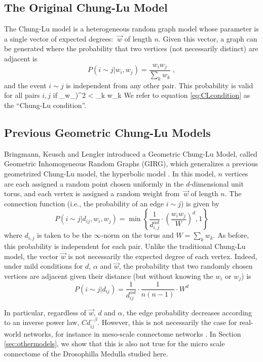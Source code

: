 \documentclass[11]{article}
\def\ba #1\ea{\begin{align} #1 \end{align}}
\theoremstyle{remark}
\theoremstyle{definition}
\begin{document}
\subsection{The Original Chung-Lu Model \label{sec:CLorig}}

The Chung-Lu model \cite{chunglu} is a heterogeneous random graph model whose parameter is a single vector of expected degrees: $\ \vec w$ of length $n$. Given this vector, a graph can be generated where the probability that two vertices (not necessarily distinct) are adjacent is 
\[ P(i \sim j | w_i, w_j) = \frac{w_i w_j}{\sum_k w_k}\;, \]
and the event $i \sim j$ is independent from any other pair.
This probability is valid for all pairs $i, j$ if
\ba  (\max_\ell w_\ell)^2 < \sum_k w_k \label{eq:CLcondition}\ea
We refer to equation \ref{eq:CLcondition} as the ``Chung-Lu condition''.

\subsection{Previous Geometric Chung-Lu Models\label{sec:CLgeomother}}

Bringmann, Keusch and Lengler  introduced a Geometric Chung-Lu Model, called Geometric Inhomogeneous Random Graphs (GIRG), \cite{bringmann2019geometric} which generalizes a previous geometrized Chung-Lu model, the hyperbolic model \cite{hyperchunglu}. In this model, $n$ vertices are each assigned a random point chosen uniformly in the $d$-dimensional unit torus, and each vertex is assigned a random weight from $\ \vec w$ of length $n$. The connection function (i.e., the probability of an edge $i\sim j$) is given by
\[ P(i \sim j | d_{ij}, w_i, w_j ) = \min \left \{  \frac{1}{d_{i,j}^{\alpha d}} \cdot \left( \frac{w_i w_j}{W} \right)^{d}, 1 \right \} \]
where $d_{i,j}$ is taken to be the $\infty$-norm on the torus and $W = \sum_k w_k$. As before, this probability is independent for each pair.  Unlike the traditional Chung-Lu model, the vector $\vec w$ is not necessarily the expected degree of each vertex. 
Indeed, under mild conditions for $d$, $\alpha$ and $\vec w$, the probability that two randomly chosen vertices are adjacent given their distance (but without knowing the $w_i$ or $w_j$) is 
\[ P(i\sim j | d_{ij}) = \frac{1}{d_{ij}^{\alpha d}} \cdot \frac{1}{n(n-1)} \cdot W^d  \]

In particular, regardless of $\vec w$, $d$ and $\alpha$, the edge probability decreases according to an inverse power law, $C d_{ij}^{-\beta}$. However, this is not necessarily the case for real-world networks, for instance in meso-scale connectome networks \cite{humanspatialconnectome,connectometutorial,marmoset}.
In Section \ref{sec:othermodels}, we show that this is also not true for the micro scale connectome of the Drosophilla Medulla studied here.
\end{document}
